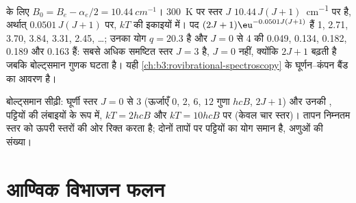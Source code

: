 \begin{example}[हाइड्रोजन क्लोराइड के घूर्णी स्तर]\label{ex:b3:partition-functions:hcl}
 के लिए $B_0 = B_e - \alpha_e/2 = \qty{10.44}{cm^{-1}}$। \qty{300}{K} पर स्तर $J$
$10.44\,J(J+1)$~\unit{cm^{-1}} पर है, अर्थात् $0.0501\,J(J+1)$ पर, $kT$ की इकाइयों में। पद
$(2J+1)\eu^{-0.0501J(J+1)}$ हैं 1, 2.71, 3.70, 3.84, 3.31, 2.45, \dots; उनका योग
$q = 20.3$ है और $J = 0$ से 4 की  0.049, 0.134, 0.182, 0.189 और
0.163 हैं: सबसे अधिक समष्टित स्तर $J = 3$ है, $J = 0$ नहीं, क्योंकि 
$2J + 1$ बढ़ती है जबकि बोल्ट्समान गुणक घटता है। यही
\cref{ch:b3:rovibrational-spectroscopy} के घूर्णन--कंपन बैंड का आवरण है।
\end{example}

\begin{omfigure}

{\small बोल्ट्समान सीढ़ी: घूर्णी स्तर $J = 0$ से 3 (ऊर्जाएँ $0$, $2$, $6$,
$12$ गुणा $hcB$,  $2J + 1$) और उनकी , पट्टियों की लंबाइयों के रूप में,
$kT = 2hcB$ और $kT = 10hcB$ पर (केवल चार स्तर)। तापन
निम्नतम स्तर को ऊपरी स्तरों की ओर रिक्त करता है; दोनों तापों पर पट्टियों का योग
समान है, अणुओं की संख्या।}
\end{omfigure}

\section{आण्विक विभाजन फलन}

